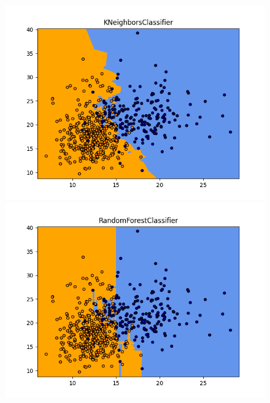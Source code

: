 \documentclass[xcolor=dvipsnames,xcolor=table]{beamer} %
\begin{document}
\begin{frame}
\begin{figure}[!htb]
		\endminipage\hfill
	\end{figure}
	
	\begin{figure}[!htb]
		\includegraphics[width=1\linewidth]{PROYECTO/imgs/metodos/4_KNeighborsClassifier}
		\endminipage\hfill
		\includegraphics[width=1\linewidth]{PROYECTO/imgs/metodos/5_RandomForestClassifier}
		\endminipage\hfill

\end{figure}
\end{frame}
\end{document}
